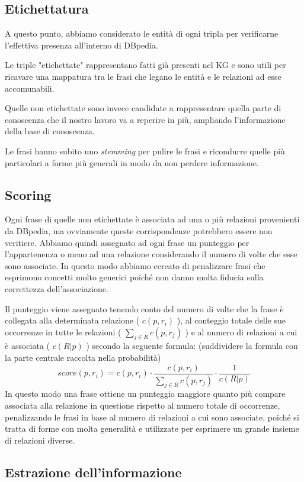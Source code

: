 \documentclass[10pt,a4paper,twocolumn]{article}
\begin{document}
\subsection{Etichettatura}
A questo punto, abbiamo considerato le entità di ogni tripla per verificarne l'effettiva presenza all'interno di DBpedia.

Le triple "etichettate" rappresentano fatti già presenti nel KG e sono utili per ricavare una mappatura tra le frasi che legano le entità e le relazioni ad esse accomunabili.

Quelle non etichettate sono invece candidate a rappresentare quella parte di conoscenza che il nostro lavoro va a reperire in più, ampliando l'informazione della base di conoscenza.

Le frasi hanno subito uno \textit{stemming} per pulire le frasi e ricondurre quelle più particolari a forme più generali in modo da non perdere informazione.

\subsection{Scoring}

Ogni frase di quelle non etichettate è associata ad una o più relazioni provenienti da DBpedia, ma ovviamente queste corrispondenze potrebbero essere non veritiere. Abbiamo quindi assegnato ad ogni frase un punteggio per l'appartenenza o meno ad una relazione considerando il numero di volte che esse sono associate. In questo modo abbiamo cercato di penalizzare frasi che esprimono concetti molto generici poiché non danno molta fiducia sulla correttezza dell'associazione.

Il punteggio viene assegnato tenendo conto del numero di volte che la frase è collegata alla determinata relazione ( $c(p,r_i)$ ), al conteggio totale delle sue occorrenze in tutte le relazioni ( $\sum_{j \in R} c(p,r_j)$ ) e al numero di relazioni a cui è associata ( $c(R|p)$ ) secondo la seguente formula: (suddividere la formula con la parte centrale raccolta nella probabilità)
\[score(p,r_i)=c(p,r_i)\cdot\frac{c(p,r_i)}{\sum_{j \in R}c(p,r_j)}\cdot \frac{1}{c(R|p)} \]
In questo modo una frase ottiene un punteggio maggiore quanto più compare associata alla relazione in questione rispetto al numero totale di occorrenze, penalizzando le frasi in base al numero di relazioni a cui sono associate, poiché si tratta di forme con molta generalità e utilizzate per esprimere un grande insieme di relazioni diverse. 

\subsection{Estrazione dell'informazione}
\end{document}

